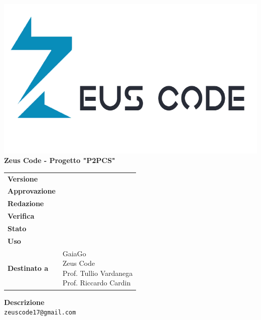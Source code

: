 \thispagestyle{empty}
\begin{titlepage}
	\begin{center}
		\includegraphics[scale = 0.3]{res/images/zeus_code_logo.png}\\
		\large \textbf{Zeus Code - Progetto "P2PCS"} \\
		\vfill
		\Huge \textbf{\doctitle}
		\vspace*{\fill}
        
        \vfill
        \large
    \end{center}
	\begin{table}[htbp]
        \centering
        \hspace*{2cm}
        \begin{tabular}{l|l}
            \textbf{Versione} & \rev{} \\
            \textbf{Approvazione} & \approv{} \\
            \textbf{Redazione} & \red{} \\
            \textbf{Verifica} & \ver{} \\
            \textbf{Stato} & \stato{} \\
            \textbf{Uso} & \uso{} \\
            \textbf{Destinato a} & \parbox[t]{5cm}{GaiaGo \\Zeus Code
            \\Prof. Tullio Vardanega\\Prof. Riccardo Cardin}
        \end{tabular}
    \end{table}
    \begin{center}
        \vfill
        \normalsize
        \textbf{Descrizione}\\
		\describedoc
        \vfill
        \small
        \texttt{zeuscode17@gmail.com}
	\end{center}
\end{titlepage}
